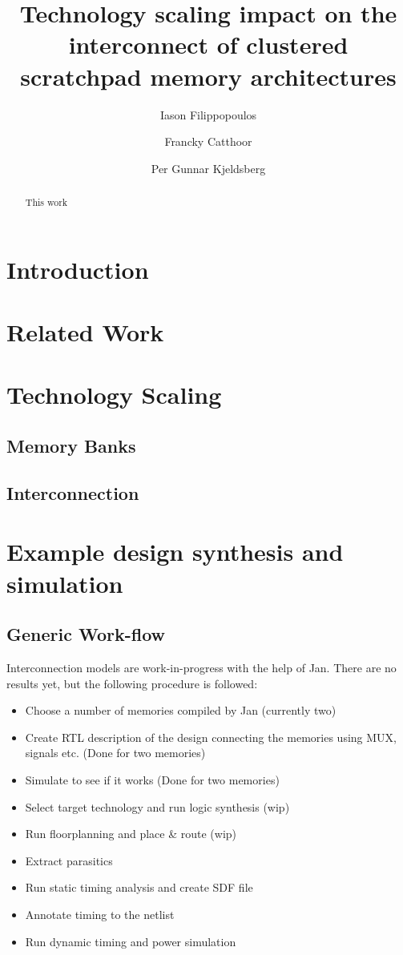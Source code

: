 \documentclass[12pt,a4paper]{article}
\author{Iason Filippopoulos \and Francky Catthoor \and Per Gunnar Kjeldsberg}
\title{Technology scaling impact on the interconnect of clustered scratchpad memory architectures}
\begin{document}
\maketitle

\begin{abstract}
This work
\end{abstract}

\section{Introduction}


\section{Related Work}


\section{Technology Scaling}

\subsection{Memory Banks}

\subsection{Interconnection}


\section{Example design synthesis and simulation}

\subsection{Generic Work-flow}

Interconnection models are work-in-progress with the help of Jan. There are no results yet, but the following procedure is followed:

\begin{itemize}
	\item Choose a number of memories compiled by Jan (currently two)
	\item Create RTL description of the design connecting the memories using MUX, signals etc. (Done for two memories)
	\item Simulate to see if it works (Done for two memories)
	\item Select target technology and run logic synthesis (wip)
	\item Run floorplanning and place \& route (wip)
	\item Extract parasitics 
	\item Run static timing analysis and create SDF file 
	\item Annotate timing to the netlist	
	\item Run dynamic timing and power simulation
\end{itemize}
\end{document}
